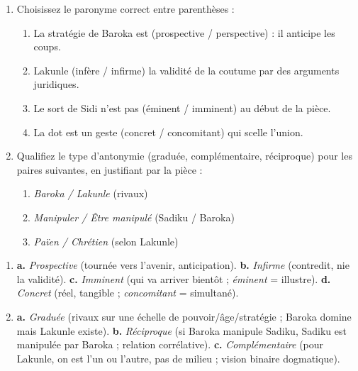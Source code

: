 \documentclass[11pt]{article}
\begin{document}
\begin{exercice}
\begin{enumerate}
    \item Choisissez le paronyme correct entre parenthèses :
    \begin{enumerate}
        \item La stratégie de Baroka est (prospective / perspective) : il anticipe les coups.
        \item Lakunle (infère / infirme) la validité de la coutume par des arguments juridiques.
        \item Le sort de Sidi n'est pas (éminent / imminent) au début de la pièce.
        \item La dot est un geste (concret / concomitant) qui scelle l'union.
    \end{enumerate}
    \item Qualifiez le type d'antonymie (graduée, complémentaire, réciproque) pour les paires suivantes, en justifiant par la pièce :
    \begin{enumerate}
        \item \emph{Baroka / Lakunle} (rivaux)
        \item \emph{Manipuler / Être manipulé} (Sadiku / Baroka)
        \item \emph{Païen / Chrétien} (selon Lakunle)
    \end{enumerate}
\end{enumerate}
\end{exercice}

\begin{corrige}
\begin{enumerate}
    \item \textbf{a.} \emph{Prospective} (tournée vers l'avenir, anticipation). \textbf{b.} \emph{Infirme} (contredit, nie la validité). \textbf{c.} \emph{Imminent} (qui va arriver bientôt ; \emph{éminent} = illustre). \textbf{d.} \emph{Concret} (réel, tangible ; \emph{concomitant} = simultané).
    \item \textbf{a.} \emph{Graduée} (rivaux sur une échelle de pouvoir/âge/stratégie ; Baroka domine mais Lakunle existe). \textbf{b.} \emph{Réciproque} (si Baroka manipule Sadiku, Sadiku est manipulée par Baroka ; relation corrélative). \textbf{c.} \emph{Complémentaire} (pour Lakunle, on est l'un ou l'autre, pas de milieu ; vision binaire dogmatique).
\end{enumerate}
\end{corrige}
\end{document}
